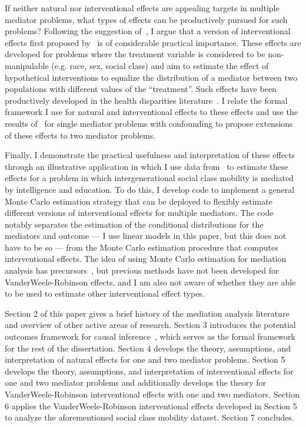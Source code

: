 If neither natural nor interventional effects are appealing targets in multiple mediator problems, 
what types of effects can be productively pursued for such problems? Following the suggestion
of~\cite{miles2023}, I argue that a version of interventional effects first proposed
by~\cite{vanderweelerobinson2014} is of considerable practical importance. These effects are developed
for problems where the treatment variable is considered to be non-manipulable
(e.g. race, sex, social class) and aim to estimate the effect of hypothetical interventions to 
equalize the distribution of a mediator between two populations with different values of the 
``treatment''. Such effects have been productively developed in the health disparities
literature~\citep{jacksonvanderweele2018,jackson2021}. I relate the formal framework I use for 
natural and interventional effects to these effects and use the results of~\cite{jacksonvanderweele2018}
for single mediator problems with confounding to propose extensions of these effects to two mediator
problems. 

Finally, I demonstrate the practical usefulness and interpretation of these effects 
through an illustrative application in which I use data from~\cite{kuhaetal2021} to estimate 
these effects for a problem in which intergenerational social class mobility is mediated by intelligence
and education. To do this, I develop code to implement a general Monte Carlo estimation strategy that can be
deployed to flexibly estimate different versions of interventional effects for multiple mediators. The code 
notably separates the estimation of the conditional distributions for the mediators and outcome --- I use
linear models in this paper, but this does not have to be so --- from the Monte Carlo estimation procedure 
that computes interventional effects. The idea of using Monte Carlo estimation for mediation analysis has 
precursors~\citep{imaietal2010b,vansteelandtdaniel2017}, but previous methods have not been developed for 
VanderWeele-Robinson effects, and I am also not aware of whether they are able to be used to estimate other 
interventional effect types. 

Section 2 of this paper gives a brief history of the mediation analysis literature and overview of other 
active areas of research. Section 3 introduces the potential outcomes framework for causal 
inference~\citep{rubin1974}, which serves as the formal framework for the rest of the dissertation. 
Section 4 develops the theory, assumptions, and interpretation of natural effects for one and two mediator
problems. Section 5 develops the theory, assumptions, and interpretation of interventional effects for one 
and two mediator problems and additionally develops the theory for VanderWeele-Robinson interventional 
effects with one and two mediators. Section 6 applies the VanderWeele-Robinson interventional 
effects developed in Section 5 to analyze the aforementioned social class mobility dataset. Section 7
concludes. 
